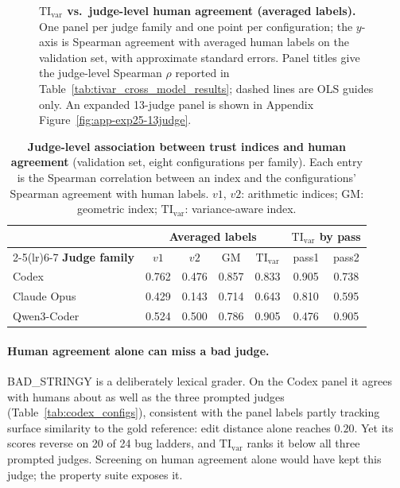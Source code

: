 \begin{figure}[t]
  \caption{\textbf{\(\mathrm{TI}_{\mathrm{var}}\) vs.\ judge-level human agreement (averaged labels).} One panel per judge family and one point per configuration; the \(y\)-axis is Spearman agreement with averaged human labels on the validation set, with approximate standard errors.
  Panel titles give the judge-level Spearman \(\rho\) reported in Table~\ref{tab:tivar_cross_model_results}; dashed lines are OLS guides only.
  An expanded 13-judge panel is shown in Appendix Figure~\ref{fig:app-exp25-13judge}.}
  \label{fig:tivar_cross_model_avg}
  \vspace{-2mm}
\end{figure}

\begin{table}[t]
  \centering
  \small
  \begin{tabular}{lcccccc}
    \toprule
                          & \multicolumn{4}{c}{\textbf{Averaged labels}} & \multicolumn{2}{c}{\textbf{\(\mathrm{TI}_{\mathrm{var}}\) by pass}} \\
    \cmidrule(lr){2-5}\cmidrule(lr){6-7}
    \textbf{Judge family} & \(v1\) & \(v2\) & GM    & \(\mathrm{TI}_{\mathrm{var}}\) & pass1 & pass2 \\
    \midrule
    Codex                 & 0.762  & 0.476  & 0.857 & 0.833                          & 0.905 & 0.738 \\
    Claude Opus           & 0.429  & 0.143  & 0.714 & 0.643                          & 0.810 & 0.595 \\
    Qwen3-Coder           & 0.524  & 0.500  & 0.786 & 0.905                          & 0.476 & 0.905 \\
    \bottomrule
  \end{tabular}
  \caption{\textbf{Judge-level association between trust indices and human agreement} (validation set, eight configurations per family).
  Each entry is the Spearman correlation between an index and the configurations' Spearman agreement with human labels.
  \(v1\), \(v2\): arithmetic indices; GM: geometric index; \(\mathrm{TI}_{\mathrm{var}}\): variance-aware index.}
  \label{tab:tivar_cross_model_results}\label{tab:cross_model_index_compare_avg}
\end{table}

\paragraph{Human agreement alone can miss a bad judge.}
BAD\_STRINGY is a deliberately lexical grader.
On the Codex panel it agrees with humans about as well as the three prompted judges (Table~\ref{tab:codex_configs}), consistent with the panel labels partly tracking surface similarity to the gold reference: edit distance alone reaches \(0.20\).
Yet its scores reverse on 20 of 24 bug ladders, and \(\mathrm{TI}_{\mathrm{var}}\) ranks it below all three prompted judges.
Screening on human agreement alone would have kept this judge; the property suite exposes it.

